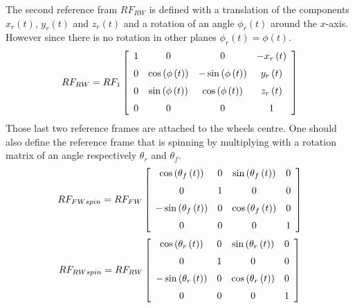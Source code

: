 %
The second reference fram $RF_{RW}$ is defined with a translation of the components $x_r(t)$, $y_r(t)$ and $z_r(t)$ and a rotation of an angle $\phi_r(t)$ around the $x$-axis. However since there is no rotation in other planes $\phi_r(t)=\phi(t)$.
%
\begin{equation}
    RF_{RW} = RF_1 
    \left[ \begin {array}{cccc} 1&0&0&-x_{r} \left( t \right) 
    \\ \noalign{\medskip}0&\cos \left( \phi \left( t \right)  \right) &-
    \sin \left( \phi \left( t \right)  \right) &y_{r} \left( t \right) 
    \\ \noalign{\medskip}0&\sin \left( \phi \left( t \right)  \right) &
    \cos \left( \phi \left( t \right)  \right) &z_{r} \left( t \right) 
    \\ \noalign{\medskip}0&0&0&1\end {array} \right]    
\end{equation}
%
Those last two reference frames are attached to the wheels centre. One should also define the reference frame that is spinning by multiplying with a rotation matrix of an angle respectively $\theta_r$ and $\theta_f$.
%
\begin{equation}
    RF_{FWspin} = RF_{FW}
    \left[ \begin {array}{cccc} \cos \left( \theta_{f} \left( t \right) 
    \right) &0&\sin \left( \theta_{f} \left( t \right)  \right) &0
    \\ \noalign{\medskip}0&1&0&0\\ \noalign{\medskip}-\sin \left( \theta_{
    f} \left( t \right)  \right) &0&\cos \left( \theta_{f} \left( t
    \right)  \right) &0\\ \noalign{\medskip}0&0&0&1\end {array} \right]
\end{equation}
%
\begin{equation}
    RF_{RWspin} = RF_{RW}
    \left[ \begin {array}{cccc} \cos \left( \theta_{r} \left( t \right) 
    \right) &0&\sin \left( \theta_{r} \left( t \right)  \right) &0
    \\ \noalign{\medskip}0&1&0&0\\ \noalign{\medskip}-\sin \left( \theta_{
    r} \left( t \right)  \right) &0&\cos \left( \theta_{r} \left( t
    \right)  \right) &0\\ \noalign{\medskip}0&0&0&1\end {array} \right] 
\end{equation}
